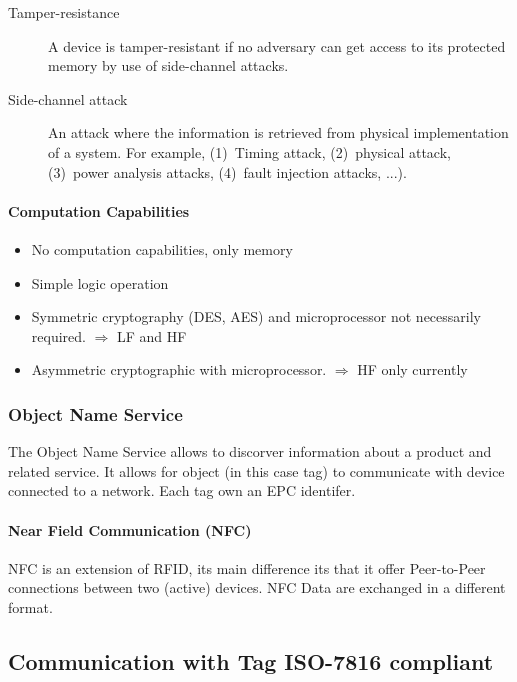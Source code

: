 \begin{description}
    \item[Tamper-resistance] A device is tamper-resistant if no adversary can
    get access to its protected memory by use of side-channel attacks.
    \item[Side-channel attack] An attack where the information is
        retrieved from physical implementation of a system. For example,
        (1)~Timing attack, (2)~physical attack, (3)~power analysis
        attacks, (4)~fault injection attacks, ...).
\end{description}

\paragraph{Computation Capabilities}
\begin{itemize}
    \item No computation capabilities, only memory
    \item Simple logic operation
    \item Symmetric cryptography (DES, AES) and microprocessor not
        necessarily required. $\Rightarrow$ LF and HF
    \item Asymmetric cryptographic with microprocessor.
        $\Rightarrow$ HF only currently
\end{itemize}

\subsubsection{Object Name Service}
 The Object Name Service allows to discorver information about a product and related
 service. It allows for object (in this case tag) to communicate with device connected to 
 a network. Each tag own an EPC identifer.

\paragraph{Near Field Communication (NFC)}
NFC is an extension of RFID, its main difference its that it offer
Peer-to-Peer connections between two (active) devices. NFC Data are exchanged
in a different format.


\subsection{Communication with Tag \textsc{ISO-7816} compliant}

